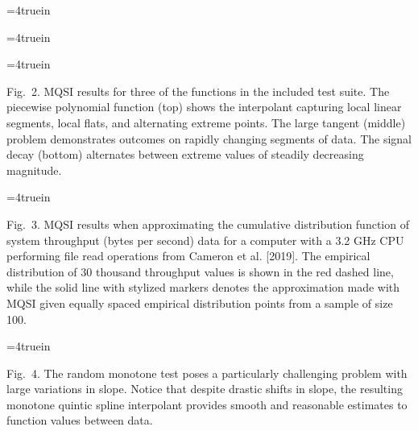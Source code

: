 
\topinsert
\centerline{\epsfxsize=4truein }
\centerline{\epsfxsize=4truein }
\centerline{\epsfxsize=4truein }
{\narrower\noindent\rmVIII Fig.\ 2.
{\ttVIII MQSI} results for three of the functions in the included test
suite. The {\itVIII piecewise polynomial} function (top) shows the
interpolant capturing local linear segments, local flats, and
alternating extreme points. The {\itVIII large tangent} (middle)
problem demonstrates outcomes on rapidly changing segments of data.
The {\itVIII signal decay} (bottom) alternates between extreme values
of steadily decreasing magnitude.
\par}
\vskip 6mm
\centerline{\epsfxsize=4truein }
{\narrower\noindent\rmVIII Fig.\ 3.
{\ttVIII MQSI} results when approximating the cumulative distribution
function of system throughput (bytes per second) data for a computer
with a 3.2 GHz CPU performing file read operations from Cameron et al.
[2019]. The empirical distribution of 30 thousand throughput values is
shown in the red dashed line, while the solid line with stylized
markers denotes the approximation made with MQSI given equally spaced
empirical distribution points from a sample of size 100.
\par}
\endinsert

\topinsert
\centerline{\epsfxsize=4truein }
{\narrower\noindent\rmVIII  Fig.\ 4.
The {\itVIII random monotone} test poses a particularly challenging
problem with large variations in slope. Notice that despite drastic
shifts in slope, the resulting monotone quintic spline interpolant
provides smooth and reasonable estimates to function values between data.
\par}
\iffalse
\vskip 15mm
\centerline{\epsfxsize=4truein \epsffile{vis/7-runtimes-10.eps}}
\centerline{\epsfxsize=4truein \epsffile{vis/8-runtimes-100.eps}}
{\everymath={\scriptstyle} \narrower\noindent\rmVIII Fig.\ 5.
Median total runtime of the routine {\ttVIII MQSI} for number of data points
$n=10$
to 100 (top) and $n=100$ to 1000 (bottom), generated from 100
repeated trials averaged over $14$ different testing functions. The
timings are colored by major algorithmic component, but the vast
majority of execution time is spent solving the banded linear system
of equations in the {\ttVIII FIT\_SPLINE} routine. The runtimes for
the quadratic facet (Algorithm 1) take roughly one microsecond
($10^{-6}$ seconds) per breakpoint, while the binary search
(Algorithm 4) takes roughly four microseconds per breakpoint.
\par}
\fi
\endinsert

